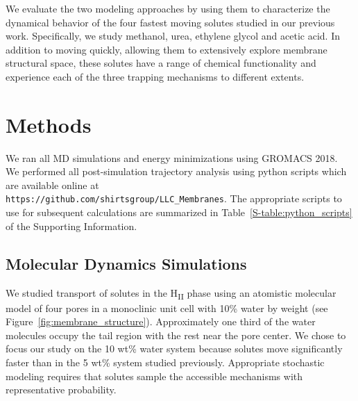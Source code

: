 \documentclass{article}
\begin{document}
  
  We evaluate the two modeling approaches by using them to characterize the dynamical
  behavior of the four fastest moving solutes studied in our previous work.
  Specifically, we study methanol, urea, ethylene glycol and acetic acid. In addition
  to moving quickly, allowing them to extensively explore membrane structural space,
  these solutes have a range of chemical functionality and experience each of the 
  three trapping mechanisms to different extents. 
  

  \section{Methods}
    
  We ran all MD simulations and energy minimizations using GROMACS 2018. 
  ~\cite{bekker_gromacs:_1993,berendsen_gromacs:_1995,van_der_spoel_gromacs:_2005,hess_gromacs_2008}
  We performed all post-simulation trajectory analysis using python scripts which 
  are available online at \\ \texttt{https://github.com/shirtsgroup/LLC\_Membranes}.
  The appropriate scripts to use for subsequent calculations are summarized in 
  Table~\ref{S-table:python_scripts} of the Supporting Information.
  
  \subsection{Molecular Dynamics Simulations}

  We studied transport of solutes in the H\textsubscript{II} phase using an atomistic
  molecular model of four pores in a monoclinic unit cell with 10\% water by weight 
  (see Figure~\ref{fig:membrane_structure}). Approximately one third of the water 
  molecules occupy the tail region with the rest near the pore center. We chose to
  focus our study on the 10 wt\% water system because solutes move significantly 
  faster than in the 5 wt\% system studied previously. Appropriate stochastic 
  modeling requires that solutes sample the accessible mechanisms with representative
  probability.
  
\end{document}
